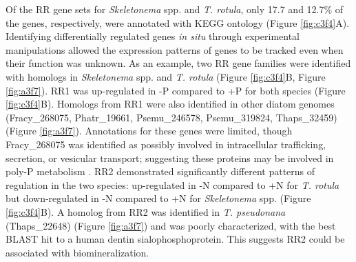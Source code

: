 Of the RR gene sets for \textit{Skeletonema} spp. and \textit{T. rotula}, only 17.7 and 12.7\% of the genes, respectively, were annotated with KEGG ontology (Figure \ref{fig:c3f4}A). Identifying differentially regulated genes \textit{in situ} through experimental manipulations allowed the expression patterns of genes to be tracked even when their function was unknown. As an example, two RR gene families were identified with homologs in \textit{Skeletonema} spp. and \textit{T. rotula} (Figure \ref{fig:c3f4}B, Figure \ref{fig:a3f7}). RR1 was up-regulated in -P compared to +P for both species (Figure \ref{fig:c3f4}B). Homologs from RR1 were also identified in other diatom genomes (Fracy\_268075, Phatr\_19661, Psemu\_246578, Psemu\_319824, Thaps\_32459) (Figure \ref{fig:a3f7}). Annotations for these genes were limited, though Fracy\_268075 was identified as possibly involved in intracellular trafficking, secretion, or vesicular transport; suggesting these proteins may be involved in poly-P metabolism \citep{Ogawa2000}. RR2 demonstrated significantly different patterns of regulation in the two species: up-regulated in -N compared to +N for \textit{T. rotula} but down-regulated in -N compared to +N for \textit{Skeletonema} spp. (Figure \ref{fig:c3f4}B). A homolog from RR2 was identified in \textit{T. pseudonana} (Thaps\_22648) (Figure \ref{fig:a3f7}) and was poorly characterized, with the best BLAST hit to a human dentin sialophosphoprotein. This suggests RR2 could be associated with biomineralization.\par
